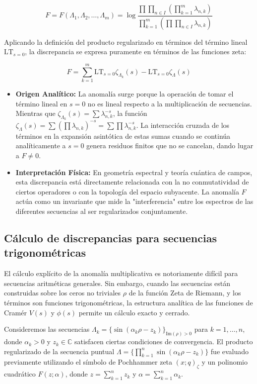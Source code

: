 $$ F = F(\Lambda_1, \Lambda_2, \dots, \Lambda_m) = \log \frac{\prod\prod_{n \in I} \left( \prod_{k=1}^m \lambda_{n,k} \right)}{\prod_{k=1}^m \left( \prod\prod_{n \in I} \lambda_{n,k} \right)} $$

Aplicando la definición del producto regularizado en términos del término lineal $\text{LT}_{s=0}$, la discrepancia se expresa puramente en términos de las funciones zeta:

$$ F = \sum_{k=1}^m \text{LT}_{s=0} \zeta_{\Lambda_k}(s) - \text{LT}_{s=0} \zeta_{\Lambda}(s) $$

\begin{itemize}
    \item \textbf{Origen Analítico:} La anomalía surge porque la operación de tomar el término lineal en $s=0$ no es lineal respecto a la multiplicación de secuencias. Mientras que $\zeta_{\Lambda_k}(s) = \sum \lambda_{n,k}^{-s}$, la función $\zeta_\Lambda(s) = \sum (\prod \lambda_{n,k})^{-s} = \sum \prod \lambda_{n,k}^{-s}$. La interacción cruzada de los términos en la expansión asintótica de estas sumas cuando se continúa analíticamente a $s=0$ genera residuos finitos que no se cancelan, dando lugar a $F \neq 0$.
    \item \textbf{Interpretación Física:} En geometría espectral y teoría cuántica de campos, esta discrepancia está directamente relacionada con la no conmutatividad de ciertos operadores o con la topología del espacio subyacente. La anomalía $F$ actúa como un invariante que mide la "interferencia" entre los espectros de las diferentes secuencias al ser regularizados conjuntamente.
\end{itemize}

\subsection{Cálculo de discrepancias para secuencias trigonométricas}

El cálculo explícito de la anomalía multiplicativa es notoriamente difícil para secuencias aritméticas generales. Sin embargo, cuando las secuencias están construidas sobre los ceros no triviales $\rho$ de la función Zeta de Riemann, y los términos son funciones trigonométricas, la estructura analítica de las funciones de Cramér $V(s)$ y $\phi(s)$ permite un cálculo exacto y cerrado.

Consideremos las secuencias $\Lambda_k = \{\sin(\alpha_k \rho - z_k)\}_{\text{Im}(\rho)>0}$ para $k=1, \dots, n$, donde $\alpha_k > 0$ y $z_k \in \mathbb{C}$ satisfacen ciertas condiciones de convergencia. El producto regularizado de la secuencia puntual $\Lambda = \{\prod_{k=1}^n \sin(\alpha_k \rho - z_k)\}$ fue evaluado previamente utilizando el símbolo de Pochhammer zeta $(x; q)_\zeta$ y un polinomio cuadrático $F(z; \alpha)$, donde $z = \sum_{k=1}^n z_k$ y $\alpha = \sum_{k=1}^n \alpha_k$.

